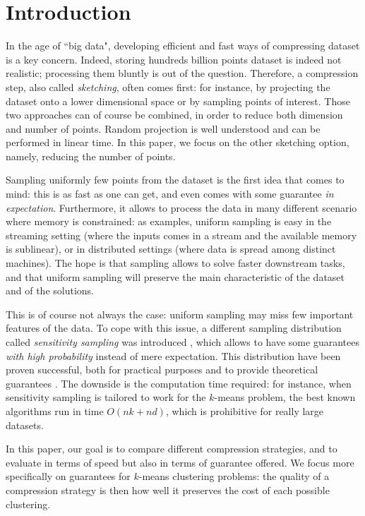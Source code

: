 \section{Introduction}

In the age of ``big data", developing efficient and fast ways of compressing dataset is a key concern. Indeed, storing hundreds billion points dataset is indeed not realistic; processing them bluntly is out of the question. 
Therefore, a compression step, also called \textit{sketching}, often comes first: for instance, by projecting the dataset onto a lower dimensional space or by sampling points of interest. Those two approaches can of course be combined, in order to reduce both dimension and number of points. 
Random projection is well understood and can be performed in linear time. 
In this paper, we focus on the other sketching option, namely, reducing the number of points.

Sampling uniformly few points from the dataset is the first idea that comes to mind: this is as fast as one can get, and even comes with some guarantee \emph{in expectation}. 
Furthermore, it allows to process the data in many different scenario where memory is constrained: as examples, uniform sampling is easy in the streaming setting (where the inputs comes in a stream and the available memory is sublinear), or in distributed settings (where data is spread among distinct machines).
The hope is that sampling allows to solve faster downstream tasks, and that uniform sampling will preserve the main characteristic of the dataset and of the solutions.

This is of course not always the case: uniform sampling may miss few important features of the data. 
To cope with this issue, a different sampling distribution called \textit{sensitivity sampling} was introduced \cite{LS10}, which allows to have some guarantees \textit{with high probability} instead of mere expectation.
This distribution have been proven successful, both for practical purposes \cite{ref} and to provide theoretical guarantees \cite{FeldmanL11, CohenP15}. 
The downside is the computation time required: for instance, when sensitivity sampling is tailored to work for the $k$-means problem, the best known algorithms run in time $O(nk+nd)$, which is prohibitive for really large datasets.

In this paper, our goal is to compare different compression strategies, and to evaluate in terms of speed but also in terms of guarantee offered. We focus more specifically on guarantees for $k$-means clustering problems: the quality of a compression strategy is then how well it preserves the cost of each possible clustering.



